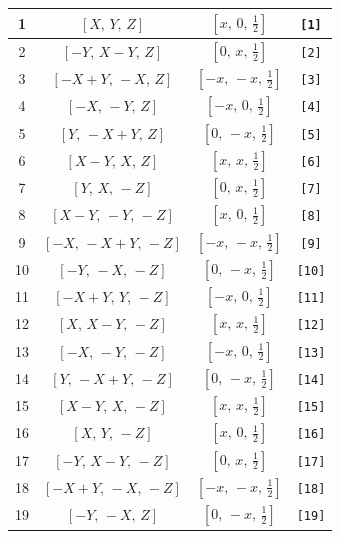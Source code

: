 \documentclass[fleqn,8pt]{jsarticle}
\begin{document}
\begin{longtable}{cccc}
1 & $\left[ X,\, Y,\, Z \right]$ & $\left[ x,\, 0,\, \frac{1}{2} \right]$ & {\tt [1]} \\ \hline
2 & $\left[ - Y,\, X - Y,\, Z \right]$ & $\left[ 0,\, x,\, \frac{1}{2} \right]$ & {\tt [2]} \\ \hline
3 & $\left[ - X + Y,\, - X,\, Z \right]$ & $\left[ - x,\, - x,\, \frac{1}{2} \right]$ & {\tt [3]} \\ \hline
4 & $\left[ - X,\, - Y,\, Z \right]$ & $\left[ - x,\, 0,\, \frac{1}{2} \right]$ & {\tt [4]} \\ \hline
5 & $\left[ Y,\, - X + Y,\, Z \right]$ & $\left[ 0,\, - x,\, \frac{1}{2} \right]$ & {\tt [5]} \\ \hline
6 & $\left[ X - Y,\, X,\, Z \right]$ & $\left[ x,\, x,\, \frac{1}{2} \right]$ & {\tt [6]} \\ \hline
7 & $\left[ Y,\, X,\, - Z \right]$ & $\left[ 0,\, x,\, \frac{1}{2} \right]$ & {\tt [7]} \\ \hline
8 & $\left[ X - Y,\, - Y,\, - Z \right]$ & $\left[ x,\, 0,\, \frac{1}{2} \right]$ & {\tt [8]} \\ \hline
9 & $\left[ - X,\, - X + Y,\, - Z \right]$ & $\left[ - x,\, - x,\, \frac{1}{2} \right]$ & {\tt [9]} \\ \hline
10 & $\left[ - Y,\, - X,\, - Z \right]$ & $\left[ 0,\, - x,\, \frac{1}{2} \right]$ & {\tt [10]} \\ \hline
11 & $\left[ - X + Y,\, Y,\, - Z \right]$ & $\left[ - x,\, 0,\, \frac{1}{2} \right]$ & {\tt [11]} \\ \hline
12 & $\left[ X,\, X - Y,\, - Z \right]$ & $\left[ x,\, x,\, \frac{1}{2} \right]$ & {\tt [12]} \\ \hline
13 & $\left[ - X,\, - Y,\, - Z \right]$ & $\left[ - x,\, 0,\, \frac{1}{2} \right]$ & {\tt [13]} \\ \hline
14 & $\left[ Y,\, - X + Y,\, - Z \right]$ & $\left[ 0,\, - x,\, \frac{1}{2} \right]$ & {\tt [14]} \\ \hline
15 & $\left[ X - Y,\, X,\, - Z \right]$ & $\left[ x,\, x,\, \frac{1}{2} \right]$ & {\tt [15]} \\ \hline
16 & $\left[ X,\, Y,\, - Z \right]$ & $\left[ x,\, 0,\, \frac{1}{2} \right]$ & {\tt [16]} \\ \hline
17 & $\left[ - Y,\, X - Y,\, - Z \right]$ & $\left[ 0,\, x,\, \frac{1}{2} \right]$ & {\tt [17]} \\ \hline
18 & $\left[ - X + Y,\, - X,\, - Z \right]$ & $\left[ - x,\, - x,\, \frac{1}{2} \right]$ & {\tt [18]} \\ \hline
19 & $\left[ - Y,\, - X,\, Z \right]$ & $\left[ 0,\, - x,\, \frac{1}{2} \right]$ & {\tt [19]} \\ \hline

\end{longtable}
\end{document}
